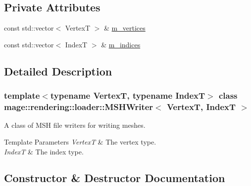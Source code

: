 \subsection*{Private Attributes}
\begin{DoxyCompactItemize}
\item 
const std\+::vector$<$ VertexT $>$ \& \mbox{\hyperlink{classmage_1_1rendering_1_1loader_1_1_m_s_h_writer_adf2b47491fdda0077ba3bf1053f343d0}{m\+\_\+vertices}}
\item 
const std\+::vector$<$ IndexT $>$ \& \mbox{\hyperlink{classmage_1_1rendering_1_1loader_1_1_m_s_h_writer_a7de7ca864e3a3a384bf7c98997146748}{m\+\_\+indices}}
\end{DoxyCompactItemize}


\subsection{Detailed Description}
\subsubsection*{template$<$typename VertexT, typename IndexT$>$\newline
class mage\+::rendering\+::loader\+::\+M\+S\+H\+Writer$<$ Vertex\+T, Index\+T $>$}

A class of M\+SH file writers for writing meshes.


\begin{DoxyTemplParams}{Template Parameters}
{\em VertexT} & The vertex type. \\
\hline
{\em IndexT} & The index type. \\
\hline
\end{DoxyTemplParams}


\subsection{Constructor \& Destructor Documentation}
\mbox{\label{classmage_1_1rendering_1_1loader_1_1_m_s_h_writer_a5e1a7ed8ca94f157f52bba929cac2fd3}} 
